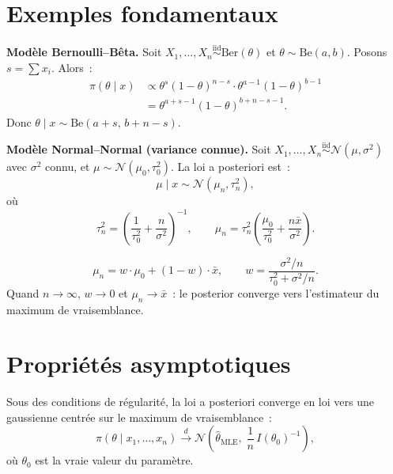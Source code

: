 \section{Exemples fondamentaux}

\begin{exemple}
\textbf{Mod\`ele Bernoulli--B\^eta.}
Soit $X_1, \ldots, X_n \overset{\text{iid}}{\sim} \text{Ber}(\theta)$
et $\theta \sim \text{Be}(a, b)$. Posons $s = \sum x_i$. Alors~:
\begin{align*}
  \pi(\theta \mid x)
  &\propto \theta^s (1-\theta)^{n-s} \cdot \theta^{a-1}(1-\theta)^{b-1} \\
  &= \theta^{a+s-1}(1-\theta)^{b+n-s-1}.
\end{align*}
Donc $\theta \mid x \sim \text{Be}(a + s, \, b + n - s)$.
\end{exemple}

\begin{exemple}
\textbf{Mod\`ele Normal--Normal (variance connue).}
Soit $X_1, \ldots, X_n \overset{\text{iid}}{\sim} \mathcal{N}(\mu, \sigma^2)$
avec $\sigma^2$ connu, et $\mu \sim \mathcal{N}(\mu_0, \tau_0^2)$.
La loi a posteriori est~:
\[
  \mu \mid x \sim \mathcal{N}(\mu_n, \tau_n^2),
\]
o\`u
\[
  \tau_n^2 = \left(\frac{1}{\tau_0^2} + \frac{n}{\sigma^2}\right)^{-1}, \qquad
  \mu_n = \tau_n^2 \left(\frac{\mu_0}{\tau_0^2} + \frac{n\bar{x}}{\sigma^2}\right).
\]
\end{exemple}

\begin{formules}[title=\textbf{Moyenne a posteriori comme moyenne pond\'er\'ee}]
\[
  \mu_n = w \cdot \mu_0 + (1-w) \cdot \bar{x},
  \qquad w = \frac{\sigma^2/n}{\tau_0^2 + \sigma^2/n}.
\]
Quand $n \to \infty$, $w \to 0$ et $\mu_n \to \bar{x}$~: le posterior
converge vers l'estimateur du maximum de vraisemblance.
\end{formules}

\section{Propri\'et\'es asymptotiques}

\begin{theoreme}
Sous des conditions de r\'egularit\'e, la loi a posteriori converge
en loi vers une gaussienne centr\'ee sur le maximum de vraisemblance~:
\[
  \pi(\theta \mid x_1, \ldots, x_n)
  \xrightarrow{d}
  \mathcal{N}\!\left(\hat{\theta}_{\text{MLE}},\;
  \frac{1}{n}\,I(\theta_0)^{-1}\right),
\]
o\`u $\theta_0$ est la vraie valeur du param\`etre.
\end{theoreme}

